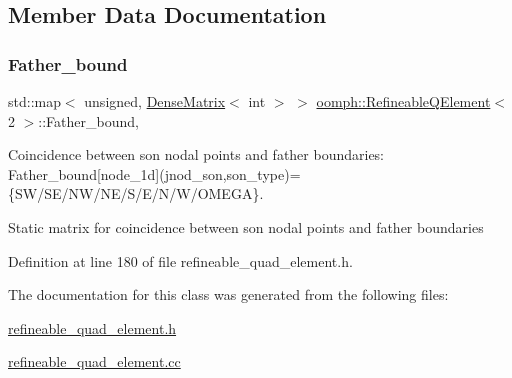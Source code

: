 \subsection{Member Data Documentation}
\mbox{\label{classoomph_1_1RefineableQElement_3_012_01_4_a95f17825b651c0ce6ec5daa2dd7c8fde}} 
\subsubsection{\texorpdfstring{Father\+\_\+bound}{Father\_bound}}
{\footnotesize\ttfamily std\+::map$<$ unsigned, \hyperlink{classoomph_1_1DenseMatrix}{Dense\+Matrix}$<$ int $>$ $>$ \hyperlink{classoomph_1_1RefineableQElement}{oomph\+::\+Refineable\+Q\+Element}$<$ 2 $>$\+::Father\+\_\+bound\hspace{0.3cm}{\ttfamily [static]}, {\ttfamily [protected]}}



Coincidence between son nodal points and father boundaries\+: Father\+\_\+bound\mbox{[}node\+\_\+1d\mbox{]}(jnod\+\_\+son,son\+\_\+type)=\{S\+W/\+S\+E/\+N\+W/\+N\+E/\+S/\+E/\+N/\+W/\+O\+M\+E\+GA\}. 

Static matrix for coincidence between son nodal points and father boundaries 

Definition at line 180 of file refineable\+\_\+quad\+\_\+element.\+h.



The documentation for this class was generated from the following files\+:\begin{DoxyCompactItemize}
\item 
\hyperlink{refineable__quad__element_8h}{refineable\+\_\+quad\+\_\+element.\+h}\item 
\hyperlink{refineable__quad__element_8cc}{refineable\+\_\+quad\+\_\+element.\+cc}\end{DoxyCompactItemize}
